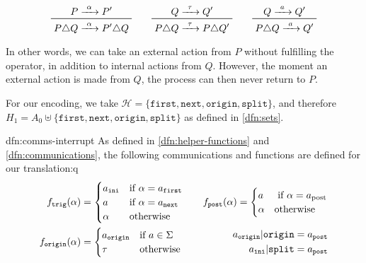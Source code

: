 \documentclass[../hons_project.tex]{subfiles}
\begin{document}
\[\prftree{P \prightarrow{\alpha} P'}{P \interrupt Q \prightarrow{\alpha} P' \interrupt Q} \qquad \prftree{Q \prightarrow{\tau} Q'}{P \interrupt Q \prightarrow{\tau} P \interrupt Q'} \qquad \prftree{Q \prightarrow{a} Q'}{P \interrupt Q \prightarrow{a} Q'}\]

In other words, we can take an external action from $P$ without fulfilling the operator, in addition to internal actions from $Q$. However, the moment an external action is made from $Q$, the process can then never return to $P$.

For our encoding, we take $\mathscr{H} = \{\mathtt{first}, \mathtt{next}, \mathtt{origin}, \mathtt{split}\}$, and therefore $H_{1} = A_{0} \uplus \{\mathtt{first}, \mathtt{next}, \mathtt{origin}, \mathtt{split}\}$ as defined in \ref{dfn:sets}.

\begin{dfn}{dfn:comms-interrupt}{}
	As defined in \ref{dfn:helper-functions} and \ref{dfn:communications}, the following communications and functions are defined for our translation:q
	\begin{align*}
		f_{\mathtt{trig}}(\alpha)             & = \begin{cases}
			                                          a_{\mathtt{ini}} & \text{if } \alpha = a_{\mathtt{first}} \\
			                                          a                & \text{if } \alpha = a_{\mathtt{next}}  \\
			                                          \alpha           & \text{otherwise}
		                                          \end{cases} \quad
											  &f_{\mathtt{post}}(\alpha)             = \begin{cases}
			                                          a      & \text{ if } \alpha = a_{\mathrm{post}} \\
			                                          \alpha & \text{otherwise}
		                                          \end{cases}                                                                    \\
		f_{\mathtt{origin}}(\alpha)                 & = \begin{cases}
			                                          a_{\mathtt{origin}} & \text{if } a\in\Sigma \\
			                                          \tau                & \text{otherwise}
		                                          \end{cases}\quad
											  &\begin{split}
		    a_{\mathtt{origin}} | \mathtt{origin} &= a_{\mathtt{post}} \\ a_{\mathtt{ini}} | \mathtt{split} &= a_{\mathtt{post}}
		\end{split}
	\end{align*}


\end{dfn}
\end{document}
